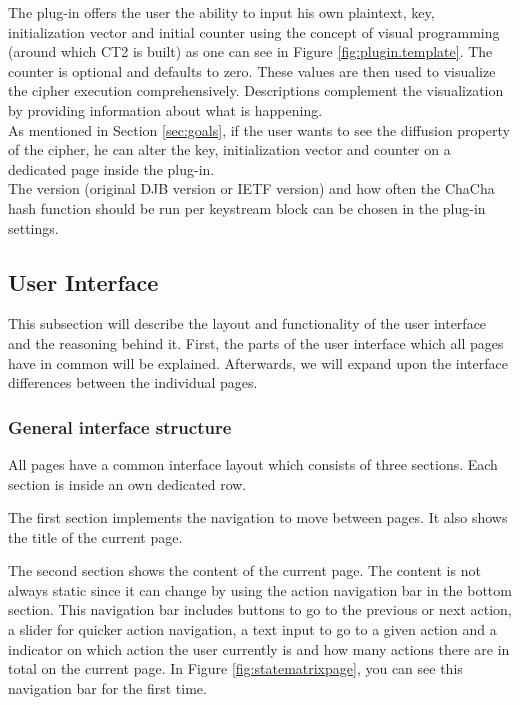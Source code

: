 The plug-in offers the user the ability to input his own plaintext, key, initialization vector and initial counter using the concept of visual programming (around which CT2 is built) as one can see in Figure \ref{fig:plugin.template}. The counter is optional and defaults to zero. These values are then used to visualize the cipher execution comprehensively. Descriptions complement the visualization by providing information about what is happening. \\
As mentioned in Section \ref{sec:goals}, if the user wants to see the diffusion property of the cipher, he can alter the key, initialization vector and counter on a dedicated page inside the plug-in. \\
The version (original DJB version or IETF version) and how often the ChaCha hash function should be run per keystream block can be chosen in the plug-in settings.

\subsection{User Interface}
\label{sec:userInterface}

This subsection will describe the layout and functionality of the user interface and the reasoning behind it. First, the parts of the user interface which all pages have in common will be explained. Afterwards, we will expand upon the interface differences between the individual pages.

\subsubsection{General interface structure}

All pages have a common interface layout which consists of three sections. Each section is inside an own dedicated row.

The first section implements the navigation to move between pages. It also shows the title of the current page.

The second section shows the content of the current page. The content is not always static since it can change by using the action navigation bar in the bottom section. This navigation bar includes buttons to go to the previous or next action, a slider for quicker action navigation, a text input to go to a given action and a indicator on which action the user currently is and how many actions there are in total on the current page. In Figure \ref{fig:statematrixpage}, you can see this navigation bar for the first time.

